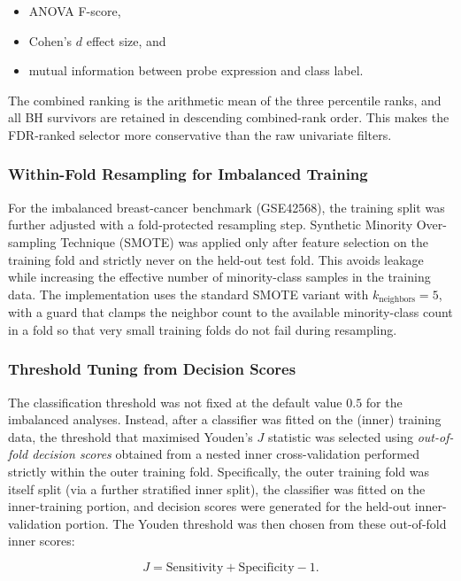 \begin{itemize}
    \item ANOVA F-score,
    \item Cohen's $d$ effect size, and
    \item mutual information between probe expression and class label.
\end{itemize}

The combined ranking is the arithmetic mean of the three percentile ranks, and all BH survivors are retained in descending combined-rank order. This makes the FDR-ranked selector more conservative than the raw univariate filters.

\subsubsection{Within-Fold Resampling for Imbalanced Training}

For the imbalanced breast-cancer benchmark (GSE42568), the training split was further adjusted with a fold-protected resampling step. Synthetic Minority Over-sampling Technique (SMOTE) was applied only after feature selection on the training fold and strictly never on the held-out test fold. This avoids leakage while increasing the effective number of minority-class samples in the training data. The implementation uses the standard SMOTE variant with $k_{\text{neighbors}} = 5$, with a guard that clamps the neighbor count to the available minority-class count in a fold so that very small training folds do not fail during resampling.

\subsubsection{Threshold Tuning from Decision Scores}

The classification threshold was not fixed at the default value $0.5$ for the imbalanced analyses. Instead, after a classifier was fitted on the (inner) training data, the threshold that maximised Youden's $J$ statistic was selected using \emph{out-of-fold decision scores} obtained from a nested inner cross-validation performed strictly within the outer training fold. Specifically, the outer training fold was itself split (via a further stratified inner split), the classifier was fitted on the inner-training portion, and decision scores were generated for the held-out inner-validation portion. The Youden threshold was then chosen from these out-of-fold inner scores:

\begin{equation}
    J = \text{Sensitivity} + \text{Specificity} - 1.
\end{equation}

